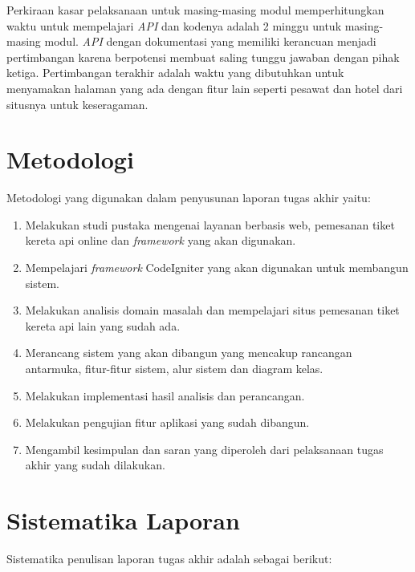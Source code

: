 Perkiraan kasar pelaksanaan untuk masing-masing modul memperhitungkan waktu untuk mempelajari \textit{API} dan kodenya adalah 2 minggu untuk masing-masing modul. \textit{API} dengan dokumentasi yang memiliki kerancuan menjadi pertimbangan karena berpotensi membuat saling tunggu jawaban dengan pihak ketiga. Pertimbangan terakhir adalah waktu yang dibutuhkan untuk menyamakan halaman yang ada dengan fitur lain seperti pesawat dan hotel dari situsnya untuk keseragaman.

\section{Metodologi}
\label{sec:metodologi}
Metodologi yang digunakan dalam penyusunan laporan tugas akhir yaitu:

\begin{enumerate}
	\item Melakukan studi pustaka mengenai layanan berbasis web, pemesanan tiket kereta api online dan \textit{framework} yang akan digunakan.
	\item Mempelajari \textit{framework} CodeIgniter yang akan digunakan untuk membangun sistem.
	\item Melakukan analisis domain masalah dan mempelajari situs pemesanan tiket kereta api lain yang sudah ada.
	\item Merancang sistem yang akan dibangun yang mencakup rancangan antarmuka, fitur-fitur sistem, alur sistem dan diagram kelas.
	\item Melakukan implementasi hasil analisis dan perancangan.
	\item Melakukan pengujian fitur aplikasi yang sudah dibangun.
	\item Mengambil kesimpulan dan saran yang diperoleh dari pelaksanaan tugas akhir yang sudah dilakukan.
\end{enumerate}


\section{Sistematika Laporan}
\label{sec:sistemlaporan}
Sistematika penulisan laporan tugas akhir adalah sebagai berikut:

